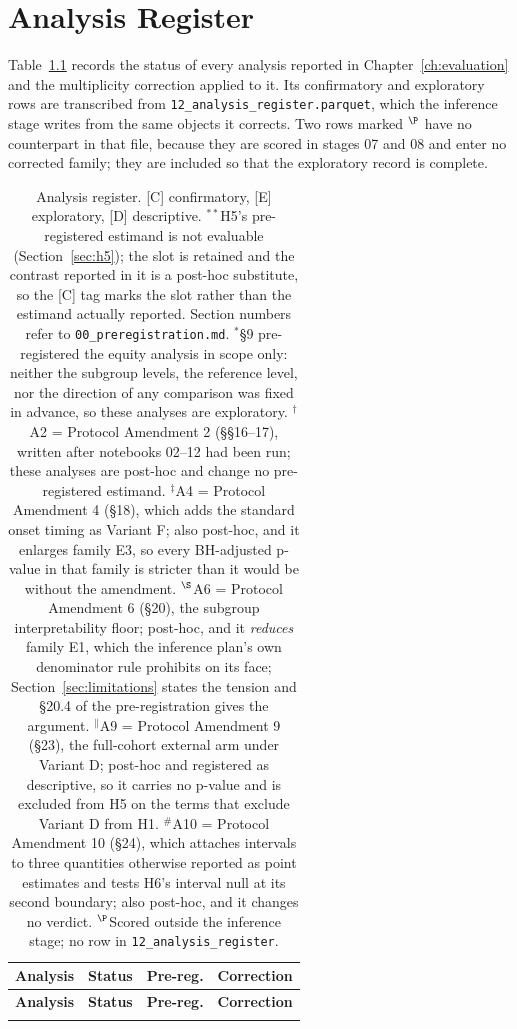 \chapter{Analysis Register}
\label{sec:register}

Table~\ref{tab:register} records the status of every analysis reported in
Chapter~\ref{ch:evaluation} and the multiplicity correction applied to it. Its confirmatory and
exploratory rows are transcribed from
\texttt{12\_analysis\_\allowbreak register\allowbreak .parquet}, which the
inference stage writes from the same objects it corrects. Two rows marked
$^\P$ have no counterpart in that file, because they are scored in stages 07
and 08 and enter no corrected family; they are included so that the
exploratory record is complete.

{\footnotesize\setlength{\tabcolsep}{4pt}
\begin{longtable}{p{5.0cm}lp{1.9cm}p{4.2cm}}
    \caption{Analysis register. [C] confirmatory, [E] exploratory,
    [D] descriptive. $^{**}$H5's pre-registered estimand is not evaluable
    (Section~\ref{sec:h5}); the slot is retained and the contrast reported in
    it is a post-hoc substitute, so the [C] tag marks the slot rather than the
    estimand actually reported. Section numbers refer to
    \texttt{00\_preregistration.md}. $^*$\S9 pre-registered the equity analysis
    in scope only: neither the subgroup levels, the reference level, nor the
    direction of any comparison was fixed in advance, so these analyses are
    exploratory. $^\dagger$A2 = Protocol Amendment 2 (\S\S16--17), written after
    notebooks 02--12 had been run; these analyses are post-hoc and change no
    pre-registered estimand. $^\ddagger$A4 = Protocol Amendment 4 (\S18), which
    adds the standard onset timing as Variant F; also post-hoc, and it enlarges
    family E3, so every BH-adjusted p-value in that family is stricter than it
    would be without the amendment. $^\S$A6 = Protocol Amendment 6 (\S20), the
    subgroup interpretability floor; post-hoc, and it \emph{reduces} family E1,
    which the inference plan's own denominator rule prohibits on its face;
    Section~\ref{sec:limitations} states the tension and \S20.4 of the
    pre-registration gives the argument. $^\|$A9 = Protocol Amendment 9 (\S23), the
    full-cohort external arm under Variant D; post-hoc and registered as
    descriptive, so it carries no p-value and is excluded from H5 on the terms
    that exclude Variant D from H1. $^{\#}$A10 = Protocol Amendment 10
    (\S24), which attaches intervals to three quantities otherwise reported as
    point estimates and tests H6's interval null at its second boundary; also
    post-hoc, and it changes no verdict. $^\P$Scored outside the inference
    stage; no row in \texttt{12\_analysis\_register}.}\label{tab:register}\\
    \toprule
    \textbf{Analysis} & \textbf{Status} & \textbf{Pre-reg.} & \textbf{Correction} \\
    \midrule
    \endfirsthead
    \toprule
    \textbf{Analysis} & \textbf{Status} & \textbf{Pre-reg.} & \textbf{Correction} \\
    \midrule
    \endhead
    \bottomrule
    \endfoot


\end{longtable}}
